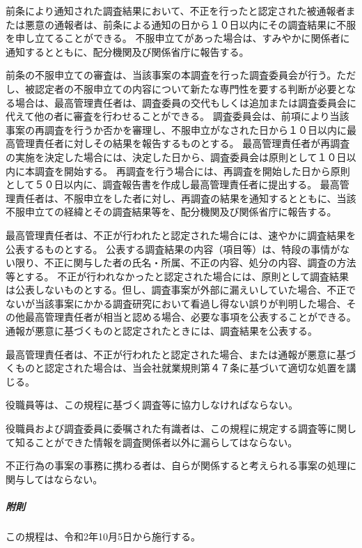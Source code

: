 \documentclass[10pt,a4paper,uplatex]{jsarticle}
\begin{document}
前条により通知された調査結果において、不正を行ったと認定された被通報者または悪意の通報者は、前条による通知の日から１０日以内にその調査結果に不服を申し立てることができる。
\term 不服申立てがあった場合は、すみやかに関係者に通知するとともに、配分機関及び関係省庁に報告する。

前条の不服申立ての審査は、当該事案の本調査を行った調査委員会が行う。ただし、被認定者の不服申立ての内容について新たな専門性を要する判断が必要となる場合は、最高管理責任者は、調査委員の交代もしくは追加または調査委員会に代えて他の者に審査を行わせることができる。
\term 調査委員会は、前項により当該事案の再調査を行うか否かを審理し、不服申立がなされた日から１０日以内に最高管理責任者に対しその結果を報告するものとする。
\term 最高管理責任者が再調査の実施を決定した場合には、決定した日から、調査委員会は原則として１０日以内に本調査を開始する。
\term 再調査を行う場合には、再調査を開始した日から原則として５０日以内に、調査報告書を作成し最高管理責任者に提出する。
\term 最高管理責任者は、不服申立をした者に対し、再調査の結果を通知するとともに、当該不服申立ての経緯とその調査結果等を、配分機関及び関係省庁に報告する。

最高管理責任者は、不正が行われたと認定された場合には、速やかに調査結果を公表するものとする。
\term 公表する調査結果の内容（項目等）は、特段の事情がない限り、不正に関与した者の氏名・所属、不正の内容、処分の内容、調査の方法等とする。
\term 不正が行われなかったと認定された場合には、原則として調査結果は公表しないものとする。但し、調査事案が外部に漏えいしていた場合、不正でないが当該事案にかかる調査研究において看過し得ない誤りが判明した場合、その他最高管理責任者が相当と認める場合、必要な事項を公表することができる。
\term 通報が悪意に基づくものと認定されたときには、調査結果を公表する。

最高管理責任者は、不正が行われたと認定された場合、または通報が悪意に基づくものと認定された場合は、当会社就業規則第４７条に基づいて適切な処置を講じる。

役職員等は、この規程に基づく調査等に協力しなければならない。

役職員および調査委員に委嘱された有識者は、この規程に規定する調査等に関して知ることができた情報を調査関係者以外に漏らしてはならない。

不正行為の事案の事務に携わる者は、自らが関係すると考えられる事案の処理に関与してはならない。
\\

\subparagraph{附則}
この規程は、令和2年10月5日から施行する。
\end{document}

